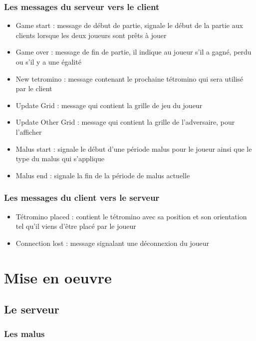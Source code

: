 \documentclass[a4paper, 12pt]{article}
\begin{document}
			\subsubsection{Les messages du serveur vers le client}

				\begin{itemize}
					\item Game start : message de début de partie, signale le début de la partie aux clients lorsque les deux joueurs sont prêts à jouer
					\item Game over : message de fin de partie, il indique au joueur s'il a gagné, perdu ou s'il y a une égalité
					\item New tetromino : message contenant le prochaine tétromino qui sera utilisé par le client
					\item Update Grid : message qui contient la grille de jeu du joueur
					\item Update Other Grid : message qui contient la grille de l'adversaire, pour l'afficher
					\item Malus start : signale le début d'une période malus pour le joueur ainsi que le type du malus qui s'applique
					\item Malus end : signale la fin de la période de malus actuelle
				\end{itemize}

			\subsubsection{Les messages du client vers le serveur}

				\begin{itemize}
					\item Tétromino placed : contient le tétromino avec sa position et son orientation tel qu'il viens d'être placé par le joueur
					\item Connection lost : message signalant une déconnexion du joueur
				\end{itemize}




\section{Mise en oeuvre}
	\subsection{Le serveur}


	\subsubsection{Les malus}
\end{document}
